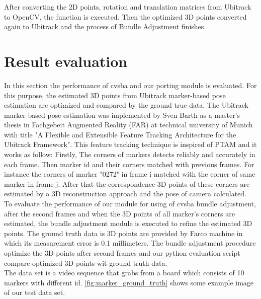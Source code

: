 After converting the 2D points, rotation and translation matrices from Ubitrack to OpenCV, the  function is executed. Then the optimized 3D points converted again to Ubitrack and the process of Bundle Adjustment finishes.\\

\section{Result evaluation}
In this section the performance of cvsba and our porting module is evaluated. For this purpose, the estimated 3D points from Ubitrack marker-based pose estimation are optimized and compared by the ground true data. The Ubitrack marker-based pose estimation was implemented by Sven Barth as a master's thesis in Fachgebeit Augmented Reality (FAR) at technical university of Munich with title "A Flexible and Extensible Feature Tracking Architecture for the Ubitrack Framework". This feature tracking technique is inspired of PTAM \cite{klein2007parallel} and it works as follow: Firstly, The corners of markers detects reliably and accurately in each frame. Then marker id and their corners matched with previous frames. For instance the corners of marker "0272" in frame i matched with the corner of same marker in frame j. After that the correspondence 3D points of these corners are estimated by a 3D reconstruction approach and the pose of camera calculated.\\
To evaluate the performance of our module for using of cvsba bundle adjustment, after the second frames and when the 3D points of all marker's corners are estimated, the bundle adjustment module is executed to refine the estimated 3D points. The ground truth data is 3D points are provided by Farco machine in which its measurement error is 0.1 millimeters. The bundle adjustment procedure optimize the 3D points after second frames and our python evaluation script compare optimized 3D points wit ground truth data.\\
The data set is a video sequence that grabs from a board which consists of 10 markers with different id. \autoref{fig:marker_ground_truth} shows some example image of our test data set.
